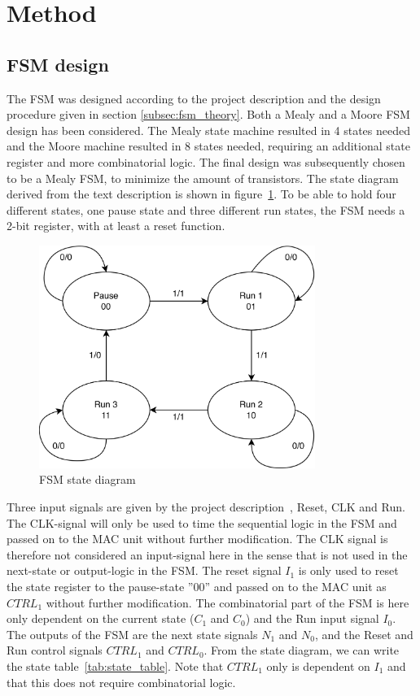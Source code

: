 \section{Method}
\label{sec:method}

\subsection{FSM design}

The FSM was designed according to the project description and the design procedure given in section \ref{subsec:fsm_theory}. Both a Mealy and a Moore FSM design has been considered. The Mealy state machine resulted in 4 states needed and the Moore machine resulted in 8 states needed, requiring an additional state register and more combinatorial logic. The final design was subsequently chosen to be a Mealy FSM, to minimize the amount of transistors. The state diagram derived from the text description is shown in figure~\ref{fig:fsm_diagram}. To be able to hold four different states, one pause state and three different run states, the FSM needs a 2-bit register, with at least a reset function. 

\begin{figure}[H]
    \centering
    \includegraphics[width=0.8\textwidth]{Figures/FSM-diagram.png}
    \caption{FSM state diagram}
    \label{fig:fsm_diagram}
\end{figure}

Three input signals are given by the project description~\cite{project_description}, Reset, CLK and Run. The CLK-signal
will only be used to time the sequential logic in the FSM and passed on to the MAC unit without
further modification. The CLK signal is therefore not considered an input-signal here in the sense that is not used in the next-state or output-logic in the FSM. The reset signal $I_1$ is only used to reset the state register to the pause-state ''00'' and passed on to the MAC unit as $CTRL_1$ without further modification. The combinatorial part of the FSM is here only dependent on the current state ($C_1$ and $C_0$) and the Run input signal $I_0$. The outputs of the FSM are the next state signals $N_1$ and $N_0$, and the Reset and Run control signals $CTRL_1$ and $CTRL_0$. From the state diagram, we can write the state table~\ref{tab:state_table}. Note that $CTRL_1$ only is dependent on $I_1$ and that this does not require combinatorial logic.

